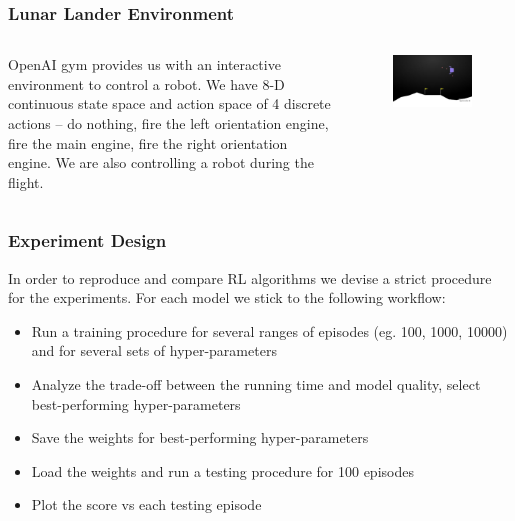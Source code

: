 \documentclass{beamer}
\begin{document}
\begin{frame}
\frametitle{Lunar Lander Environment}
\begin{columns}[c] %
	
	OpenAI gym provides us with an interactive environment
	to control a robot. We have 8-D continuous 
	state space and action space of 4 discrete actions -- 
	do nothing, fire the left orientation engine, fire the main
	engine, fire the right orientation engine. 
	We are also controlling a robot during the flight. 
	
	\begin{figure}
	\includegraphics[scale=0.5]{lunar}
	\end{figure}
		
\end{columns}
\end{frame}


\begin{frame}
\frametitle{Experiment Design}
In order to reproduce and compare RL algorithms we devise 
a strict procedure for the experiments.
For each model we stick to the following workflow:

\begin{itemize}
	\item Run a training procedure for several ranges of episodes (eg. 100, 1000, 10000) and for several sets of hyper-parameters
	
	\item Analyze the trade-off between the running time and 
	model quality, select best-performing hyper-parameters
	
	\item Save the weights for best-performing hyper-parameters
	
	\item Load the weights and run a testing procedure for 100 episodes 
	
	\item Plot the score vs each testing episode
\end{itemize}

\end{frame}
\end{document}
